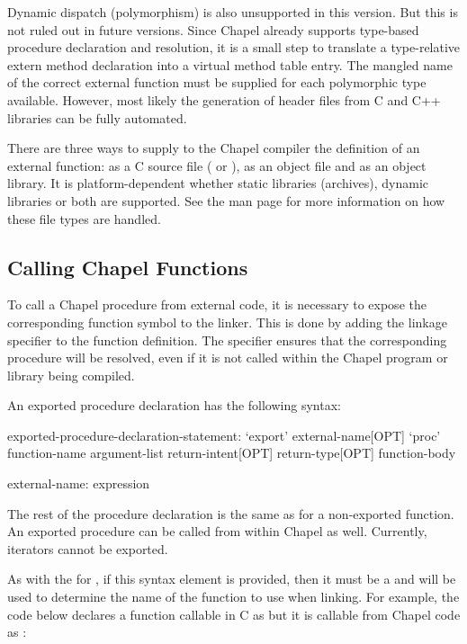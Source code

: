 \begin{future}
Dynamic dispatch (polymorphism) is also unsupported in this version.  But this
is not ruled out in future versions.  Since Chapel already supports type-based
procedure declaration and resolution, it is a small step to translate a
type-relative extern method declaration into a virtual method table entry.  The
mangled name of the correct external function must be supplied for each
polymorphic type available.  However, most likely the generation of 
header files from C and C++ libraries can be fully automated.
\end{future}

There are three ways to supply to the Chapel compiler the definition of an
external function: as a C source file ( or ), as an object
file and as an object library.  It is platform-dependent whether static
libraries (archives), dynamic libraries or both are supported.  See
the  man page for more information on how these file types are handled.

\subsection{Calling Chapel Functions}
\label{Calling_Chapel_Functions}

To call a Chapel procedure from external code, it is necessary to expose the
corresponding function symbol to the linker.  This is done by adding
the  linkage specifier to the function definition.
The  specifier ensures that the corresponding procedure will be
resolved, even if it is not called within the Chapel program or library being
compiled.

An exported procedure declaration has the following syntax:
\begin{syntax}
exported-procedure-declaration-statement:
  `export' external-name[OPT] `proc' function-name argument-list return-intent[OPT] return-type[OPT]
    function-body

external-name:
  expression
\end{syntax}

The rest of the procedure declaration is the same as for a non-exported
function.  An exported procedure can be called from within Chapel as
well. Currently, iterators cannot be exported.

As with the  for  , if this
syntax element is provided, then it must be a  
and will be used to determine the name of the function to use when
linking. For example, the code below declares a function callable in C as
 but it is callable from Chapel code as
:

